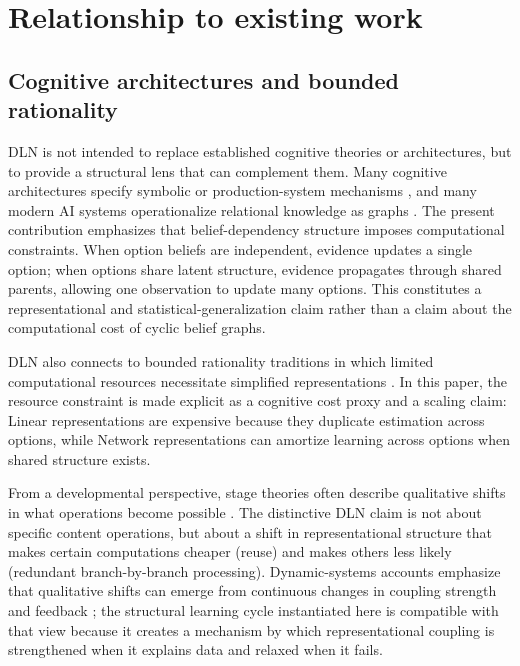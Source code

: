 \documentclass[11pt]{article}
\begin{document}
\section{Relationship to existing work}

\subsection{Cognitive architectures and bounded rationality}

DLN is not intended to replace established cognitive theories or architectures, but to provide a structural lens that can complement them. Many cognitive architectures specify symbolic or production-system mechanisms \cite{ACTR2004,Laird2012}, and many modern AI systems operationalize relational knowledge as graphs \cite{Hogan2021}. The present contribution emphasizes that belief-dependency structure imposes computational constraints. When option beliefs are independent, evidence updates a single option; when options share latent structure, evidence propagates through shared parents, allowing one observation to update many options. This constitutes a representational and statistical-generalization claim rather than a claim about the computational cost of cyclic belief graphs.

DLN also connects to bounded rationality traditions in which limited computational resources necessitate simplified representations \cite{Simon1955,TverskyKahneman1974,GigerenzerGoldstein1996}. In this paper, the resource constraint is made explicit as a cognitive cost proxy and a scaling claim: Linear representations are expensive because they duplicate estimation across options, while Network representations can amortize learning across options when shared structure exists.

From a developmental perspective, stage theories often describe qualitative shifts in what operations become possible \cite{Piaget1952,Kegan1994}. The distinctive DLN claim is not about specific content operations, but about a shift in representational structure that makes certain computations cheaper (reuse) and makes others less likely (redundant branch-by-branch processing). Dynamic-systems accounts emphasize that qualitative shifts can emerge from continuous changes in coupling strength and feedback \cite{ThelenSmith1994}; the structural learning cycle instantiated here is compatible with that view because it creates a mechanism by which representational coupling is strengthened when it explains data and relaxed when it fails.
\end{document}
